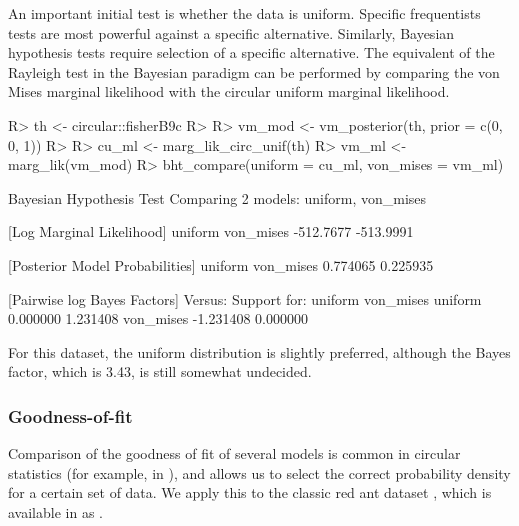 An important initial test is whether the data is uniform. Specific
frequentists tests are most powerful against a specific alternative.
Similarly, Bayesian hypothesis tests require selection of a specific
alternative. The equivalent of the Rayleigh test
\citep{mardia2009directional, brazier1994confidence} in the Bayesian
paradigm can be performed by comparing the von Mises marginal likelihood
with the circular uniform marginal likelihood.

\begin{CodeChunk}

\begin{CodeInput}
R> th <- circular::fisherB9c
R> 
R> vm_mod <- vm_posterior(th, prior = c(0, 0, 1))
R> 
R> cu_ml  <- marg_lik_circ_unif(th)
R> vm_ml  <- marg_lik(vm_mod)
R> bht_compare(uniform = cu_ml, von_mises = vm_ml)
\end{CodeInput}

\begin{CodeOutput}
Bayesian Hypothesis Test
    Comparing 2 models: uniform, von_mises

[Log Marginal Likelihood]
  uniform von_mises 
-512.7677 -513.9991 

[Posterior Model Probabilities]
  uniform von_mises 
 0.774065  0.225935 

[Pairwise log Bayes Factors]
               Versus: 
Support for:      uniform von_mises
      uniform    0.000000  1.231408
      von_mises -1.231408  0.000000
\end{CodeOutput}
\end{CodeChunk}

For this dataset, the uniform distribution is slightly preferred,
although the Bayes factor, which is 3.43, is still somewhat undecided.

\hypertarget{goodness-of-fit}{%
\subsubsection{Goodness-of-fit}\label{goodness-of-fit}}

Comparison of the goodness of fit of several models is common in
circular statistics (for example, in \citet{pewsey2013circular}), and
allows us to select the correct probability density for a certain set of
data. We apply this to the classic red ant dataset
\citep{jander1957optische, fisher1995statistical}, which is available in
 as .

